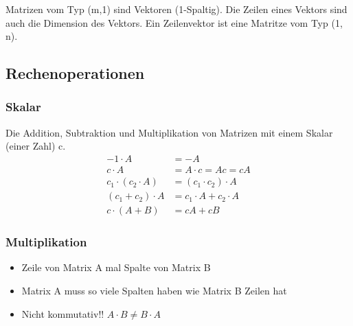 \documentclass[german]{latex4ei/latex4ei_sheet}
\begin{document}
\begin{sectionbox}
Matrizen vom Typ (m,1) sind Vektoren (1-Spaltig). Die Zeilen eines Vektors sind auch die Dimension des Vektors. Ein Zeilenvektor ist eine Matritze vom Typ (1, n).

\subsection{Rechenoperationen}
\subsubsection{Skalar}
Die Addition, Subtraktion und Multiplikation von Matrizen mit einem Skalar (einer Zahl) c.
\begin{align*}
-1 \cdot A &= -A \\ 
c \cdot A &= A \cdot c = Ac = cA \\
{c}_{1} \cdot \left( {c}_{2} \cdot A \right) &= \left( {c}_{1} \cdot {c}_{2} \right) \cdot A \\\left({c}_{1} + {c}_{2} \right) \cdot A &= {c}_{1} \cdot A + {c}_{2} \cdot A \\
c \cdot \left(A + B \right) &= cA + cB 
\end{align*}

\subsubsection{Multiplikation}
\begin{itemize}
\item Zeile von Matrix A mal Spalte von Matrix B 
\item Matrix A muss so viele Spalten haben wie Matrix B Zeilen hat 
\item Nicht kommutativ!! $A \cdot B \neq B \cdot A$
\end{itemize}

\end{sectionbox}
\end{document}

